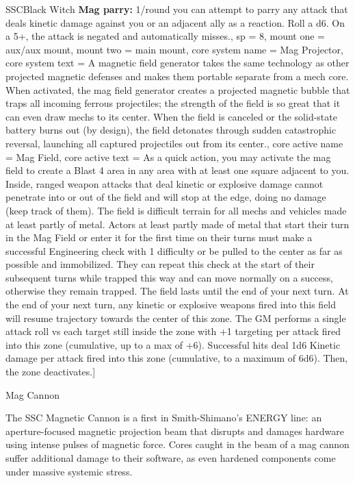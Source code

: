\begin{mech}{SSC}{Black Witch}
{\textbf{Mag parry:} 1/round you can attempt to parry any attack that deals kinetic damage against you or an adjacent ally as a reaction. Roll a d6. On a 5+, the attack is negated and automatically misses.},
sp = 8,
mount one = aux/aux mount,
mount two = main mount,
core system name = Mag Projector,
core system text = {A magnetic field generator takes the same technology as other projected magnetic defenses and makes them portable separate from a mech core. When activated, the mag field generator creates a projected magnetic bubble that traps all incoming ferrous projectiles; the strength of the field is so great that it can even draw mechs to its center. When the field is canceled or the solid-state battery burns out (by design), the field detonates through sudden catastrophic reversal, launching all captured projectiles out from its center.},
core active name = Mag Field,  
core active text = {As a quick action, you may activate the mag field to create a Blast 4 area in any area with at least one square adjacent to you. Inside, ranged weapon attacks that deal kinetic or explosive damage cannot penetrate into or out of the field and will stop at the edge, doing no damage (keep track of them). The field is difficult terrain for all mechs and vehicles made at least partly of metal. Actors at least partly made of metal that start their turn in the Mag Field or enter it for the first time on their turns must make a successful Engineering check with 1 difficulty or be pulled to the center as far as possible and immobilized. They can repeat this check at the start of their subsequent turns while trapped this way and can move normally on a success, otherwise they remain trapped. The field lasts until the end of your next turn. At the end of your next turn, any kinetic or explosive weapons fired into this field will resume trajectory towards the center of this zone. The GM performs a single attack roll vs each target still inside the zone with +1 targeting per attack fired into this zone (cumulative, up to a max of +6). Successful hits deal 1d6 Kinetic damage per attack fired into this zone (cumulative, to a maximum of 6d6). Then, the zone deactivates.}] 


Mag Cannon

The SSC Magnetic Cannon is a first in Smith-Shimano’s ENERGY line: an aperture-focused magnetic projection beam that disrupts and damages hardware using intense pulses of magnetic force. Cores caught in the beam of a mag cannon suffer additional damage to their software, as even hardened components come under massive systemic stress.


\end{mech}
